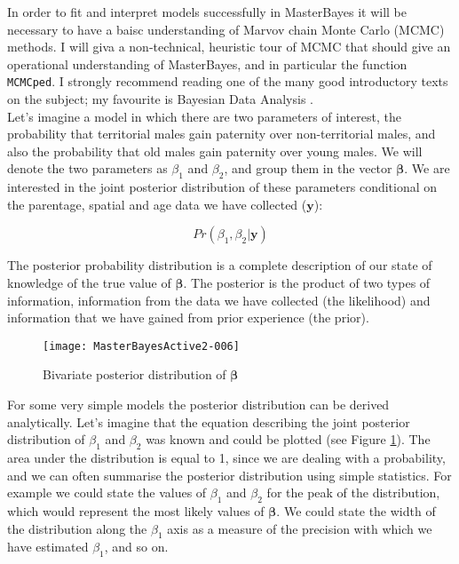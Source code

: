\documentclass{article}
\begin{document}
In order to fit and interpret models successfully in MasterBayes it will be necessary to have a baisc understanding of Marvov chain Monte Carlo (MCMC) methods.  I will giva a non-technical, heuristic tour of MCMC that should give an operational understanding of MasterBayes, and in particular the function \texttt{MCMCped}. I strongly recommend reading one of the many good introductory texts on the subject; my favourite is Bayesian Data Analysis \citep{Gelman.2004}.\\  

Let's imagine a model in which there are two parameters of interest, the probability that territorial males gain paternity over non-territorial males, and also the probability that old males gain paternity over young males.  We will denote the two parameters as $\beta_{1}$ and  $\beta_{2}$, and group them in the vector $\bm{\beta}$.   We are interested in the joint posterior distribution of these parameters conditional on the parentage, spatial and age data we have collected ($\bm{y}$):

\begin{equation}
Pr(\beta_{1}, \beta_{2} | \bm{y})
\end{equation}

The posterior probability distribution is a complete description of our state of knowledge of the true value of $\bm{\beta}$. The posterior is the product of two types of information, information from the data we have collected (the likelihood) and information that we have gained from prior experience (the prior).\\  



\begin{figure}[!h]
\begin{center}
\texttt{[image: MasterBayesActive2-006]}
\end{center}
\caption{Bivariate posterior distribution of $\bm{\beta}$}
\label{densityP}
\end{figure}

For some very simple models the posterior distribution can be derived analytically. Let's imagine that the equation describing the joint posterior distribution of $\beta_{1}$ and $\beta_{2}$ was known and could be plotted (see Figure \ref{densityP}).  The area under the distribution is equal to 1, since we are dealing with a probability, and we can often summarise the posterior distribution using simple statistics.  For example we could state the values of $\beta_{1}$ and $\beta_{2}$ for the peak of the distribution, which would represent the most likely values of $\bm{\beta}$.  We could state the width of the distribution along the $\beta_{1}$ axis as a measure of the precision with which we have estimated $\beta_{1}$, and so on.\\
\end{document}

